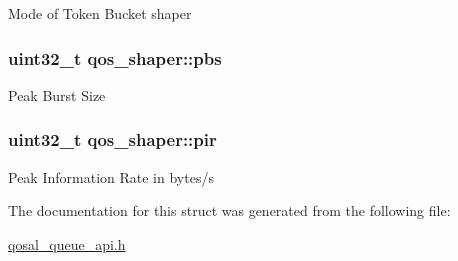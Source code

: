Mode of Token Bucket shaper \hypertarget{structqos__shaper_a38f8330e5af78779bd61778d6495179a}{
\subsubsection[{pbs}]{\setlength{\rightskip}{0pt plus 5cm}uint32\-\_\-t qos\-\_\-shaper\-::pbs}}\label{structqos__shaper_a38f8330e5af78779bd61778d6495179a}
Peak Burst Size \hypertarget{structqos__shaper_a09b81bffad8b09bd73100dbd781b2b3c}{
\subsubsection[{pir}]{\setlength{\rightskip}{0pt plus 5cm}uint32\-\_\-t qos\-\_\-shaper\-::pir}}\label{structqos__shaper_a09b81bffad8b09bd73100dbd781b2b3c}
Peak Information Rate in bytes/s 

The documentation for this struct was generated from the following file\-:\begin{DoxyCompactItemize}
\item 
\hyperlink{qosal__queue__api_8h}{qosal\-\_\-queue\-\_\-api.\-h}\end{DoxyCompactItemize}
